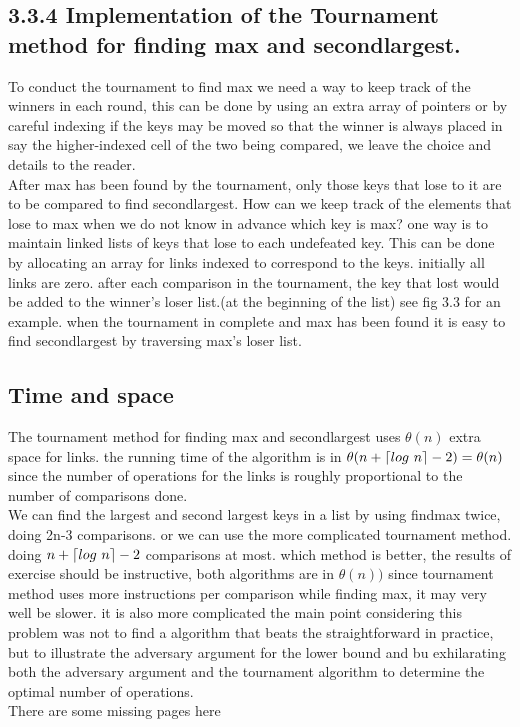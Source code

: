 \documentclass[a4paper,10pt,titlepage]{report}
\DeclarePairedDelimiter{\ceil}{\lceil}{\rceil}
\begin{document}
\subsection{3.3.4 Implementation of the Tournament method for finding max and secondlargest.}
To conduct the tournament to find max we need a way to keep track of the winners in each round, this can be done by using an extra array of pointers or by careful indexing if the keys may be moved so that the winner is always placed in say the higher-indexed cell of the two being compared, we leave the choice and details to the reader.\\
After max has been found by the tournament, only those keys that lose to it are to be compared to find secondlargest. How can we keep track of the elements that lose to max when we do not know in advance which key is max? one way is to maintain linked lists of keys that lose to each undefeated key. This can be done by allocating an array for links indexed to correspond to the keys. initially all links are zero. after each comparison in the tournament, the key that lost would be added to the winner's loser list.(at the beginning of the list) see fig 3.3 for an example. when the tournament in complete and max has been found it is easy to find secondlargest by traversing max's loser list.

\subsection{Time and space}
The tournament method for finding max and secondlargest uses $\theta(n)$ extra space for links. the running time of the algorithm is in $\theta(n+\ceil{log \ n} -2) = \theta(n)$ since the number of operations for the links is roughly proportional to the number of comparisons done.\\
We can find the largest and second largest keys in a list by using findmax twice, doing 2n-3 comparisons. or we can use the more complicated tournament method. doing $n+\ceil{log \ n}-2$ comparisons at most. which method is better, the results of exercise should be instructive, both algorithms are in $\theta(n))$ since tournament method uses more instructions per comparison while finding max, it may very well be slower. it is also more complicated the main point considering this problem was not to find a algorithm that beats the straightforward in practice, but to illustrate the adversary argument for the lower bound and bu exhilarating both the adversary argument and the tournament algorithm to determine the optimal number of operations.\\
\vspace{5mm}
There are some missing pages here
\end{document}
